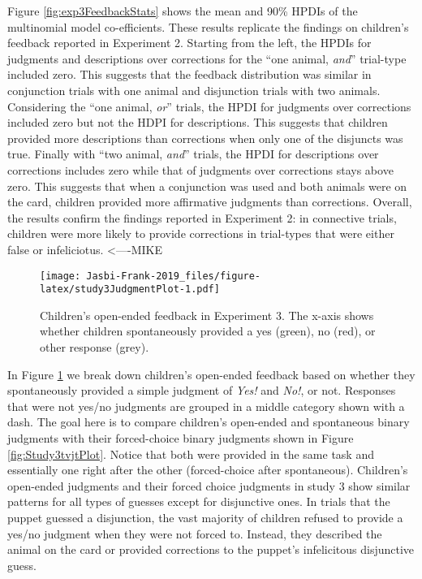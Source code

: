 \documentclass[,man,floatsintext]{apa6}
\begin{document}
Figure \ref{fig:exp3FeedbackStats} shows the mean and 90\% HPDIs of the multinomial model co-efficients. These results replicate the findings on children's feedback reported in Experiment 2. Starting from the left, the HPDIs for judgments and descriptions over corrections for the \enquote{one animal, \emph{and}} trial-type included zero. This suggests that the feedback distribution was similar in conjunction trials with one animal and disjunction trials with two animals. Considering the \enquote{one animal, \emph{or}} trials, the HPDI for judgments over corrections included zero but not the HDPI for descriptions. This suggests that children provided more descriptions than corrections when only one of the disjuncts was true. Finally with \enquote{two animal, \emph{and}} trials, the HPDI for descriptions over corrections includes zero while that of judgments over corrections stays above zero. This suggests that when a conjunction was used and both animals were on the card, children provided more affirmative judgments than corrections. Overall, the results confirm the findings reported in Experiment 2: in connective trials, children were more likely to provide corrections in trial-types that were either false or infeliciotus. \textless{}----MIKE

\begin{figure}
\centering
\texttt{[image: Jasbi-Frank-2019\_files/figure-latex/study3JudgmentPlot-1.pdf]}
\caption{\label{fig:study3JudgmentPlot}Children's open-ended feedback in Experiment 3. The x-axis shows whether children spontaneously provided a yes (green), no (red), or other response (grey).}
\end{figure}

In Figure \ref{fig:study3JudgmentPlot} we break down children's open-ended feedback based on whether they spontaneously provided a simple judgment of \emph{Yes!} and \emph{No!}, or not. Responses that were not yes/no judgments are grouped in a middle category shown with a dash. The goal here is to compare children's open-ended and spontaneous binary judgments with their forced-choice binary judgments shown in Figure \ref{fig:Study3tvjtPlot}. Notice that both were provided in the same task and essentially one right after the other (forced-choice after spontaneous). Children's open-ended judgments and their forced choice judgments in study 3 show similar patterns for all types of guesses except for disjunctive ones. In trials that the puppet guessed a disjunction, the vast majority of children refused to provide a yes/no judgment when they were not forced to. Instead, they described the animal on the card or provided corrections to the puppet's infelicitous disjunctive guess.
\end{document}
